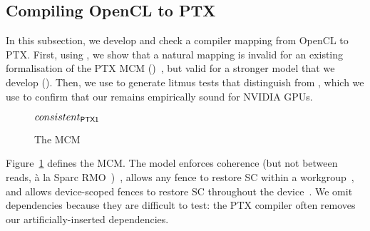 \subsection{Compiling OpenCL to PTX}
\label{sec:Q4_opencl_ptx}

In this subsection, we develop and check a compiler mapping from
OpenCL to PTX. First, using , we show that a natural mapping is invalid for an existing formalisation of the PTX MCM
()~\cite{alglave+15}, but valid for a stronger model that we
develop (). Then, we use  to generate litmus
tests that distinguish  from , which we use to
confirm that our  remains empirically sound for NVIDIA GPUs.

\begin{figure}[t]
\begin{myFrame}{$consistent_{\textsf{PTX1}}$}
\end{myFrame}
\caption{The  MCM}
\label{fig:ptx_predicates}
\end{figure}

Figure~\ref{fig:ptx_predicates} defines the  MCM. The model
enforces coherence (but not between reads, \`a la Sparc RMO~\cite{alglave12})~, allows any fence to restore
SC within a workgroup~, and allows
device-scoped fences to restore SC throughout the
device~. We omit dependencies because they are
difficult to test: the PTX compiler often removes our artificially-inserted dependencies.

